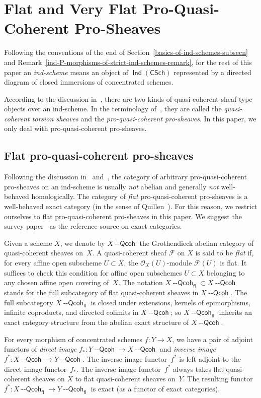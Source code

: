 \documentclass[12pt,a4paper]{amsart}
\newcommand{\+}{\protect\nobreakdash-}
\renewcommand{\:}{\colon}
\newcommand{\rarrow}{\longrightarrow}
\DeclareMathOperator{\Ind}{\mathsf{Ind}}
\newcommand{\Qcoh}{{\operatorname{\mathsf{--Qcoh}}}}
\newcommand{\fl}{\mathsf{fl}}
\newcommand{\CSch}{\mathsf{CSch}}
\newcommand{\cO}{\mathcal O}
\newcommand{\cF}{\mathcal F}
\newcommand{\Section}[1]{\bigskip\section{#1}\medskip}
\theoremstyle{plain}
\theoremstyle{definition}
\begin{document}
\Section{Flat and Very Flat Pro-Quasi-Coherent Pro-Sheaves}
\label{flat-and-vfl-proqcoh-prosheaves-secn}

 Following the conventions of the end of
Section~\ref{basics-of-ind-schemes-subsecn} and
Remark~\ref{ind-P-morphisms-of-strict-ind-schemes-remark}, for
the rest of this paper an \emph{ind-scheme} means an object of
$\Ind(\CSch)$ represented by a directed diagram of closed immersions
of concentrated schemes.

 According to the discussion in~\cite[Sections~7.11.3\+-4]{BD2},
there are two kinds of quasi-coherent sheaf-type objects over
an ind-scheme.
 In the terminology of~\cite[Chapters~2\+-3]{Psemten}, they are
called the \emph{quasi-coherent torsion sheaves} and
the \emph{pro-quasi-coherent pro-sheaves}.
 In this paper, we only deal with pro-quasi-coherent pro-sheaves.

\subsection{Flat pro-quasi-coherent pro-sheaves}
\label{flat-proqcoh-prosh-subsecn}
 Following the discussion in~\cite[Section~7.11.3]{BD2}
and~\cite[Examples~3.1 and~3.8(1)]{Psemten}, the category of arbitrary
pro-quasi-coherent pro-sheaves on an ind-scheme is usually \emph{not}
abelian and generally \emph{not} well-behaved homologically.
 The category of \emph{flat} pro-quasi-coherent pro-sheaves is
a well-behaved exact category (in the sense of Quillen~\cite{Bueh}).
 For this reason, we restrict ourselves to flat pro-quasi-coherent
pro-sheaves in this paper.
 We suggest the survey paper~\cite{Bueh} as the reference source
on exact categories.

 Given a scheme $X$, we denote by $X\Qcoh$ the Grothendieck abelian
category of quasi-coherent sheaves on~$X$.
 A quasi-coherent sheaf $\cF$ on $X$ is said to be \emph{flat} if,
for every affine open subscheme $U\subset X$, the $\cO_X(U)$\+module
$\cF(U)$ is flat.
 It suffices to check this condition for affine open subschemes
$U\subset X$ belonging to any chosen affine open covering of~$X$.
 The notation $X\Qcoh_\fl\subset X\Qcoh$ stands for the full
subcategory of flat quasi-coherent sheaves in $X\Qcoh$.
 The full subcategory $X\Qcoh_\fl$ is closed under extensions, kernels
of epimorphisms, infinite coproducts, and directed colimits in
$X\Qcoh$; so $X\Qcoh_\fl$ inherits an exact category structure from
the abelian exact structure of $X\Qcoh$.

 For every morphism of concentrated schemes $f\:Y\rarrow X$, we have
a pair of adjoint functors of \emph{direct image} $f_*\:Y\Qcoh\rarrow
X\Qcoh$ and \emph{inverse image} $f^*\:X\Qcoh\rarrow Y\Qcoh$.
 The inverse image functor~$f^*$ is left adjoint to the direct image
functor~$f_*$.
 The inverse image functor~$f^*$ always takes flat quasi-coherent
sheaves on $X$ to flat quasi-coherent sheaves on~$Y$.
 The resulting functor $f^*\:X\Qcoh_\fl\rarrow Y\Qcoh_\fl$ is exact
(as a functor of exact categories).
\end{document}
